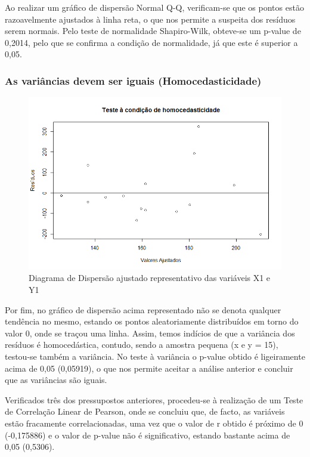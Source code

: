 \documentclass[conference]{IEEEtran}
\begin{document}
Ao realizar um gráfico de dispersão Normal Q-Q, verificam-se que os pontos estão razoavelmente ajustados à linha reta, o que nos permite a suspeita dos resíduos serem normais. Pelo teste de normalidade Shapiro-Wilk, obteve-se um p-value de 0,2014, pelo que se confirma a condição de normalidade, já que este é superior a 0,05.

\subsubsection{As variâncias devem ser iguais (Homocedasticidade)}

\begin{figure}[htbp]
\centerline{\includegraphics[width=0.95\columnwidth]{images/03.a.4.png}}
\caption{Diagrama de Dispersão ajustado representativo das variáveis X1 e Y1}
\label{fig}
\end{figure}

Por fim, no gráfico de dispersão acima representado não se denota qualquer tendência no mesmo, estando os pontos aleatoriamente distribuídos em torno do valor 0, onde se traçou uma linha. Assim, temos indícios de que a variância dos resíduos é homocedástica, contudo, sendo a amostra pequena (x e y = 15), testou-se também a variância. No teste à variância o p-value obtido é ligeiramente acima de 0,05 (0,05919), o que nos permite aceitar a análise anterior e concluir que as variâncias são iguais.

Verificados três dos pressupostos anteriores, procedeu-se à realização de um Teste de Correlação Linear de Pearson, onde se concluiu que, de facto, as variáveis estão fracamente correlacionadas, uma vez que o valor de r obtido é próximo de 0 (-0,175886) e o valor de p-value não é significativo, estando bastante acima de 0,05 (0,5306).
\end{document}
